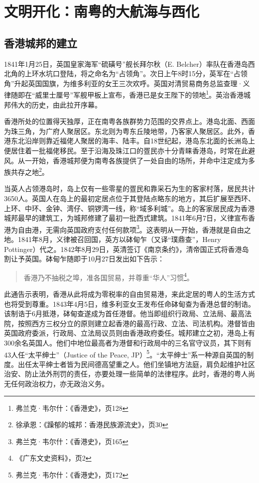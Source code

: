 \chapter{文明开化：南粤的大航海与西化}

\section{香港城邦的建立}

1841年1月25日，英国皇家海军“硫磺号”舰长拜尔秋（E. Belcher）率队在香港岛西北角的上环水坑口登陆，将之命名为“占领角”。次日上午8时15分，英军在“占领角”升起英国国旗，为维多利亚的女王三次欢呼。英国对清贸易商务总监查理·义律随即在“威里士厘号”军舰甲板上宣布，香港已是女王陛下的领地\footnote{弗兰克·韦尔什：《香港史》，页128}。英治香港城邦伟大的历史，由此拉开序幕。

香港所处的位置得天独厚，正在南粤各族群势力范围的交界点上。港岛北面、西面为珠三角，为广府人聚居区。东北则为粤东丘陵地带，乃客家人聚居区。此外，香港东北沿岸则靠近福佬人聚居的海丰、陆丰。自18世纪起，港岛东北面的长洲岛上便居住着一批福佬移民。至于沿海及珠江口的疍民亦十分青睐香港岛，时常在此避风。从一开始，香港城邦便为南粤各族提供了一处自由的场所，并命中注定成为多族共存之地\footnote{徐承恩：《躁郁的城邦：香港民族源流史》，页30}。

当英人占领港岛时，岛上仅有一些零星的疍民和靠采石为生的客家村落，居民共计3650人。英国人在岛上的最初定居点位于其登陆点略东的地方，其后扩展至西环、上环、中环、金钟、湾仔、铜锣湾一线，称“域多利城”。岛上的客家居民成为香港城邦最早的建筑工，为城邦修建了最初一批西式建筑。1841年6月7日，义律宣布香港为自由港，无需向英国政府支付任何款项\footnote{弗兰克·韦尔什：《香港史》，页165}。这表明从一开始，香港就是自由之地。1841年8月，义律被召回国，英方以砵甸乍（又译“璞鼎查”，Henry Pottinger）代之。1842年8月29日，英清签订《南京条约》，清帝国正式将香港岛割让予英国。砵甸乍随即于10月27日发出如下告示：

\begin{quote}

香港乃不抽税之埠，准各国贸易，并尊重“华人”习惯\footnote{《广东文史资料》，页2}。

\end{quote}

此通告示表明，香港从此将成为零税率的自由贸易港，来此定居的粤人的生活方式也将受到尊重。1843年4月5日，维多利亚女王发布任命砵甸查为香港总督的制诰。该制诰于6月抵港，砵甸查遂成为首任港督。他当即组织行政局、立法局、最高法院，按照西方三权分立的原则建立起香港的最高行政、立法、司法机构。港督皆由英国政府委派，行政局、立法局议员则由香港政府委任。城邦建立之初，港岛上有300余名英国人。他们中地位最高者为港督和行政局中的三名官守议员，其下则有43人任“太平绅士”（Justice of the Peace, JP）\footnote{弗兰克·韦尔什：《香港史》，页172}。“太平绅士”系一种源自英国的制度。出任太平绅士者皆为民间德高望重之人。他们坐镇地方法庭，肩负起维护社区治安、防止法外刑罚的责任，亦要处理一些简单的法律程序。此时，香港的粤人尚无任何政治权力，亦无政治义务。

